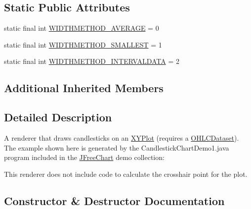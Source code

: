 \subsection*{Static Public Attributes}
\begin{DoxyCompactItemize}
\item 
static final int \mbox{\hyperlink{classorg_1_1jfree_1_1chart_1_1renderer_1_1xy_1_1_candlestick_renderer_a3e96421ed7be8208f8e2e48ade0a21d2}{W\+I\+D\+T\+H\+M\+E\+T\+H\+O\+D\+\_\+\+A\+V\+E\+R\+A\+GE}} = 0
\item 
static final int \mbox{\hyperlink{classorg_1_1jfree_1_1chart_1_1renderer_1_1xy_1_1_candlestick_renderer_a08d0154361d463e8d2204bbb8d79eb27}{W\+I\+D\+T\+H\+M\+E\+T\+H\+O\+D\+\_\+\+S\+M\+A\+L\+L\+E\+ST}} = 1
\item 
static final int \mbox{\hyperlink{classorg_1_1jfree_1_1chart_1_1renderer_1_1xy_1_1_candlestick_renderer_ad08aaacfba7eb3a8baff3e09769c8385}{W\+I\+D\+T\+H\+M\+E\+T\+H\+O\+D\+\_\+\+I\+N\+T\+E\+R\+V\+A\+L\+D\+A\+TA}} = 2
\end{DoxyCompactItemize}
\subsection*{Additional Inherited Members}


\subsection{Detailed Description}
A renderer that draws candlesticks on an \mbox{\hyperlink{}{X\+Y\+Plot}} (requires a \mbox{\hyperlink{}{O\+H\+L\+C\+Dataset}}). The example shown here is generated by the {\ttfamily Candlestick\+Chart\+Demo1.\+java} program included in the \mbox{\hyperlink{classorg_1_1jfree_1_1chart_1_1_j_free_chart}{J\+Free\+Chart}} demo collection\+: ~\newline
~\newline
  

This renderer does not include code to calculate the crosshair point for the plot. 

\subsection{Constructor \& Destructor Documentation}
\mbox{\label{classorg_1_1jfree_1_1chart_1_1renderer_1_1xy_1_1_candlestick_renderer_a37029c94803a2bf1a6272953d994ce72}} 
